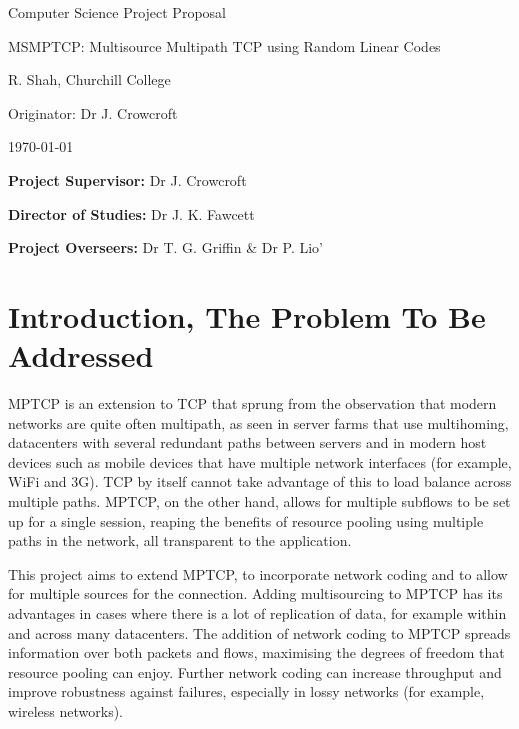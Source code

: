 \documentclass[12pt,a4paper,twoside]{article}
\begin{document}
\vfil

\centerline{\Large Computer Science Project Proposal}
\vspace{0.4in}
\centerline{\Large MSMPTCP: Multisource Multipath TCP using Random Linear Codes}
\vspace{0.4in}
\centerline{\large R. Shah, Churchill College}
\vspace{0.3in}
\centerline{\large Originator: Dr J. Crowcroft}
\vspace{0.3in}
\centerline{\large \today}

\vfil

\noindent
{\bf Project Supervisor:} Dr J. Crowcroft
\vspace{0.2in}

\noindent
{\bf Director of Studies:} Dr J. K. Fawcett
\vspace{0.2in}
\noindent
 
\noindent
{\bf Project Overseers:} Dr T. G. Griffin  \& Dr P. Lio'



\section*{Introduction, The Problem To Be Addressed}
MPTCP is an extension to TCP that sprung from the observation that modern networks are quite often multipath, as seen in server farms that use multihoming, datacenters with several redundant paths between servers and in modern host devices such as mobile devices that have multiple network interfaces (for example, WiFi and 3G). TCP by itself cannot take advantage of this to load balance across multiple paths. MPTCP, on the other hand, allows for multiple subflows to be set up for a single session, reaping the benefits of resource pooling using multiple paths in the network, all transparent to the application. \cite{mptcp}

This project aims to extend MPTCP, to incorporate network coding and to allow for multiple sources for the connection. Adding multisourcing to MPTCP has its advantages in cases where there is a lot of replication of data, for example within and across many datacenters. The addition of network coding to MPTCP spreads information over both packets and flows, maximising the degrees of freedom that resource pooling can enjoy. Further network coding can increase throughput and improve robustness against failures, especially in lossy networks (for example, wireless networks). \cite{nc-tcp}
\end{document}
